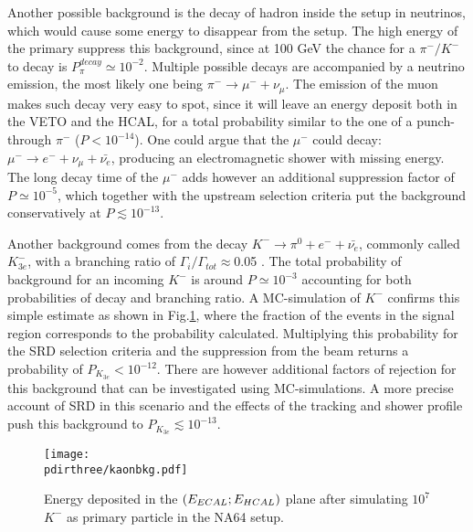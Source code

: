 Another possible background is the decay of hadron inside the setup in neutrinos, which would cause some energy to disappear from the setup. The high energy of the primary suppress this background, since at 100 GeV the chance for a $\pi^-/K^-$ to decay is $P^{decay}_{\pi} \simeq  10^{-2}$. Multiple possible decays are accompanied by a neutrino emission, the most likely one being $\pi^- \rightarrow \mu^- +\nu_{\mu}$. The emission of the muon makes such decay very easy to spot, since it will leave an energy deposit both in the VETO and the HCAL, for a total probability similar to the one of a punch-through $\pi^-$ ($P < 10^{-14}$). One could argue that the $\mu^-$ could decay: $\mu^- \rightarrow e^- + \nu_{\mu}+ \bar{\nu_{e}}$, producing an electromagnetic shower with missing energy. The long decay time of the $\mu^-$ adds however an additional suppression factor of $P\simeq 10^{-5}$, which together with the upstream selection criteria put the background conservatively at $P \lesssim 10^{-13}$.

Another background comes from the decay $K^- \rightarrow \pi^0 + e^- + \bar{\nu_e}$, commonly called $K^-_{3e}$, with a branching ratio of $\Gamma_i/\Gamma_{tot} \approx$0.05 \cite{particle-strange-mesons}. The total probability of background for an incoming $K^-$ is around $P\simeq 10^{-3}$ accounting for both probabilities of decay and branching ratio. A MC-simulation of $K^-$ confirms this simple estimate as shown in Fig.\ref{fig:kaonbkg-sim}, where the fraction of the events in the signal region corresponds to the probability calculated. Multiplying this probability for the SRD selection criteria and the suppression from the beam returns a probability of $P_{K_{3e}} < 10^{-12}$. %
There are however additional factors of rejection for this background that can be investigated using MC-simulations. A more precise account of SRD in this scenario and the effects of the tracking and shower profile push this background to $P_{K_{3e}} \lesssim 10^{-13}$.


\begin{figure}[bth!]
  \centering
  \texttt{[image: \\pdirthree/kaonbkg.pdf]}
  \caption[$K^-$ simulation ]{Energy deposited in the $(E_{ECAL};E_{HCAL})$ plane after simulating $10^7$ $K^-$ as primary particle in the NA64 setup.}
  \label{fig:kaonbkg-sim}
\end{figure}

